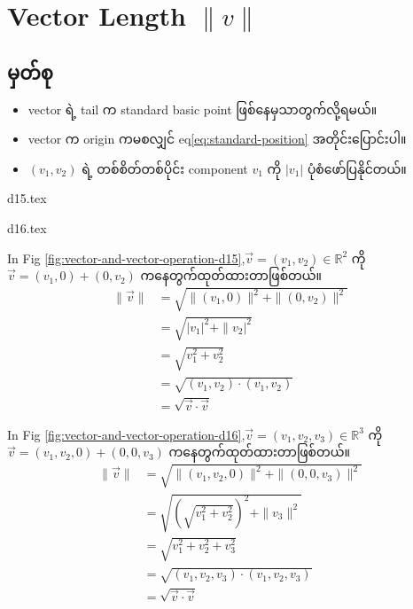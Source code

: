 \section{Vector Length $\|v\|$}
\subsection{မှတ်စု}
\begin{itemize}
    \item vector ရဲ့ tail က standard basic point ဖြစ်နေမှသာတွက်လို့ရမယ်။
    \item vector က origin ကမစလျှင် eq\ref{eq:standard-position} အတိုင်းပြောင်းပါ။
    \item $(v_1,v_2)$ ရဲ့ တစ်စိတ်တစ်ပိုင်း component $v_1$ ကို $|v_1|$ ပုံစံဖော်ပြနိုင်တယ်။
\end{itemize}
\begin{minipage}{0.45\textwidth}
    \centering
    {d15.tex}
\end{minipage}
\hfill
\begin{minipage}{0.45\textwidth}
    \centering
    {d16.tex}
\end{minipage}

In Fig \ref{fig:vector-and-vector-operation-d15},$\vec{v}=(v_1,v_2)\in\mathbb{R}^2$ ကို $\vec{v}=(v_1,0)+(0,v_2)$ ကနေတွက်ထုတ်ထားတာဖြစ်တယ်။
\[
    \begin{split}
        \|\vec{v}\| & =\sqrt{\|(v_1,0)\|^2+\|(0,v_2)\|^2} \\
                    & =\sqrt{|v_1|^2+\|v_2|^2}            \\
                    & =\sqrt{v_1^2+v_2^2}                 \\
                    & =\sqrt{(v_1,v_2)\cdot(v_1,v_2)}     \\
                    & =\sqrt{\vec{v}\cdot\vec{v}}
    \end{split}
\]

In Fig \ref{fig:vector-and-vector-operation-d16},$\vec{v}=(v_1,v_2,v_3)\in\mathbb{R}^3$ ကို $\vec{v}=(v_1,v_2,0)+(0,0,v_3)$ ကနေတွက်ထုတ်ထားတာဖြစ်တယ်။
\[
    \begin{split}
        \|\vec{v}\| & =\sqrt{\|(v_1,v_2,0)\|^2+\|(0,0,v_3)\|^2} \\
                    & =\sqrt{(\sqrt{v_1^2+v_2^2})^2+\|v_3\|^2}  \\
                    & =\sqrt{v_1^2+v_2^2+v_3^2}                 \\
                    & =\sqrt{(v_1,v_2,v_3)\cdot(v_1,v_2,v_3)}   \\
                    & =\sqrt{\vec{v}\cdot\vec{v}}
    \end{split}
\]

